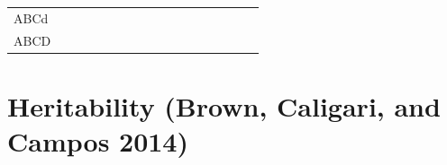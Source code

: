 \documentclass[11pt,dvipsnames,ignorenonframetext,aspectratio=169]{beamer}
\begin{document}
\begin{frame}{}
\begin{table}[H]
{\begin{tabular}{lllllllllllllllll}
ABCd & \cellcolor[HTML]{a8a035}{aAbBcCdd} & \cellcolor[HTML]{802acc}{aAbBcCdD} & \cellcolor[HTML]{802acc}{aAbBCCdd} & \cellcolor[HTML]{802acc}{aAbBCCdD} & \cellcolor[HTML]{802acc}{aABBcCdd} & \cellcolor[HTML]{802acc}{aABBcCdD} & \cellcolor[HTML]{802acc}{aABBCCdd} & \cellcolor[HTML]{802acc}{aABBCCdD} & \cellcolor[HTML]{802acc}{AAbBcCdd} & \cellcolor[HTML]{802acc}{AAbBcCdD} & \cellcolor[HTML]{802acc}{AAbBCCdd} & \cellcolor[HTML]{802acc}{AAbBCCdD} & \cellcolor[HTML]{802acc}{AABBcCdd} & \cellcolor[HTML]{802acc}{AABBcCdD} & \cellcolor[HTML]{802acc}{AABBCCdd} & \cellcolor[HTML]{802acc}{AABBCCdD}\\
ABCD & \cellcolor[HTML]{802acc}{aAbBcCdD} & \cellcolor[HTML]{802acc}{aAbBcCDD} & \cellcolor[HTML]{802acc}{aAbBCCdD} & \cellcolor[HTML]{802acc}{aAbBCCDD} & \cellcolor[HTML]{802acc}{aABBcCdD} & \cellcolor[HTML]{802acc}{aABBcCDD} & \cellcolor[HTML]{802acc}{aABBCCdD} & \cellcolor[HTML]{802acc}{aABBCCDD} & \cellcolor[HTML]{802acc}{AAbBcCdD} & \cellcolor[HTML]{802acc}{AAbBcCDD} & \cellcolor[HTML]{802acc}{AAbBCCdD} & \cellcolor[HTML]{802acc}{AAbBCCDD} & \cellcolor[HTML]{802acc}{AABBcCdD} & \cellcolor[HTML]{802acc}{AABBcCDD} & \cellcolor[HTML]{802acc}{AABBCCdD} & \cellcolor[HTML]{802acc}{AABBCCDD}\\
\bottomrule
\end{tabular}}
\endgroup{}
\end{table}

\renewcommand{\arraystretch}{1}

\end{frame}

\hypertarget{heritability-brown2014plantbreeding}{%
\section{Heritability (Brown, Caligari, and Campos
2014)}\label{heritability-brown2014plantbreeding}}
\end{document}
